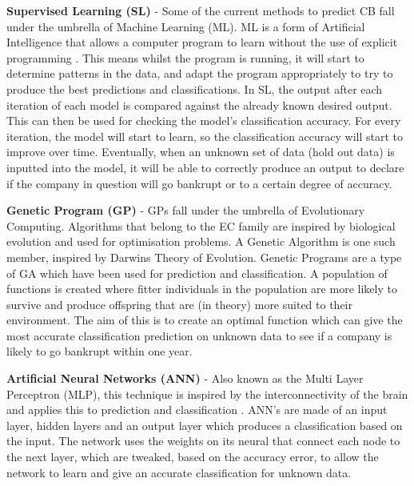 \documentclass[11pt]{article}
\begin{document}
\textbf{Supervised Learning (SL)} - Some of the current methods to predict CB fall under the umbrella of Machine Learning (ML). ML is a form of Artificial Intelligence that allows a computer program to learn without the use of explicit programming \cite{?}. This means whilst the program is running, it will start to determine patterns in the data, and adapt the program appropriately to try to produce the best predictions and classifications.
In SL, the output after each iteration of each model is compared against the already known desired output. This can then be used for checking the model's classification accuracy. For every iteration, the model will start to learn, so the classification accuracy will start to improve over time. Eventually, when an unknown set of data (hold out data) is inputted into the model, it will be able to correctly produce an output to declare if the company in question will go bankrupt or to a certain degree of accuracy.

\textbf{Genetic Program (GP)} - GPs fall under the umbrella of Evolutionary Computing. Algorithms that belong to the EC family are inspired by biological evolution and used for optimisation problems. A Genetic Algorithm is one such member, inspired by Darwins Theory of Evolution. Genetic Programs are a type of GA which have been used for prediction and classification. A population of functions is created where fitter individuals in the population are more likely to survive and produce offspring that are (in theory) more suited to their environment. The aim of this is to create an optimal function which can give the most accurate classification prediction on unknown data to see if a company is likely to go bankrupt within one year. 

\textbf{Artificial Neural Networks (ANN)} - Also known as the Multi Layer Perceptron (MLP),  this technique is inspired by the interconnectivity of the brain and applies this to prediction and classification \cite{?}. ANN's are made of an input layer, hidden layers and an output layer which produces a classification based on the input. The network uses the weights on its neural that connect each node to the next layer, which are tweaked, based on the accuracy error, to allow the network to learn and give an accurate classification for unknown data. 
\\
\end{document}

